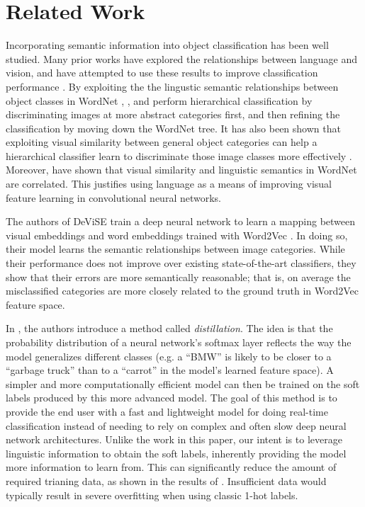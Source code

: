 \section{Related Work}


Incorporating semantic information into object classification has been well
studied. Many prior works have explored the relationships between language and
vision, and have attempted to use these results to improve classification
performance \cite{izadinia2015segment, frome2013devise}.
By exploiting the the lingustic semantic relationships between object classes
in WordNet \cite{miller1995wordnet}, \cite{marszalek2007semantic}, and
\cite{grauman2011learning} perform hierarchical classification by
discriminating images at more abstract categories first, and then refining the
classification by moving down the WordNet tree.
It has also been shown that exploiting visual similarity between general object
categories can help a hierarchical classifier learn to discriminate those image
classes more effectively \cite{li2010building}.
Moreover, \cite{deselaers2011visual} have shown that visual similarity and
linguistic semantics in WordNet are correlated. This justifies using language
as a means of improving visual feature learning in convolutional neural
networks.


The authors of DeViSE \cite{frome2013devise} train a deep neural network to
learn a mapping between visual embeddings and word embeddings trained with
Word2Vec \cite{mikolov2013distributed}. In doing so, their model learns the
semantic relationships between image categories. While their performance does
not improve over existing state-of-the-art classifiers, they show that their
errors are more semantically reasonable; that is, on average the misclassified
categories are more closely related to the ground truth in Word2Vec feature
space.


In \cite{hinton2015distilling}, the authors introduce a method called
\emph{distillation}. The idea is that the probability distribution of a neural
network's softmax layer reflects the way the model generalizes different
classes (e.g. a ``BMW'' is likely to be closer to a ``garbage truck'' than to a
``carrot'' in the model's learned feature space). A simpler and more
computationally efficient model can then be trained on the soft labels produced
by this more advanced model.
The goal of this method is to provide the end user with a fast and lightweight
model for doing real-time classification instead of needing to rely on complex
and often slow deep neural network architectures.
Unlike the work in this paper, our intent is to leverage linguistic information
to obtain the soft labels, inherently providing the model more information to
learn from. This can significantly reduce the amount of required trianing data,
as shown in the results of \cite{hinton2015distilling}. Insufficient data would
typically result in severe overfitting when using classic 1-hot labels.


